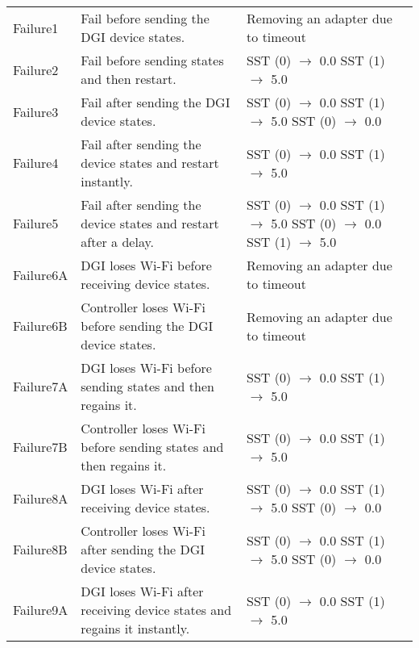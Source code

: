 \documentclass{article}
\begin{document}
\begin{center}
\begin{footnotesize}
\begin{longtable}{|p{3cm}|p{4cm}|p{10cm}|c|}
    Failure1 & Fail before sending the DGI device states. & Removing an adapter due to timeout & \\
    Failure2 & Fail before sending states and then restart. & SST (0) $\rightarrow$ 0.0 \newline SST (1) $\rightarrow$ 5.0 & \\
    Failure3 & Fail after sending the DGI device states. & SST (0) $\rightarrow$ 0.0 \newline SST (1) $\rightarrow$ 5.0 \newline SST (0) $\rightarrow$ 0.0 & \\
    Failure4 & Fail after sending the device states and restart instantly. & SST (0) $\rightarrow$ 0.0 \newline SST (1) $\rightarrow$ 5.0 & \\
    Failure5 & Fail after sending the device states and restart after a delay. & SST (0) $\rightarrow$ 0.0 \newline SST (1) $\rightarrow$ 5.0 \newline SST (0) $\rightarrow$ 0.0 \newline SST (1) $\rightarrow$ 5.0 & \\
    Failure6A & DGI loses Wi-Fi before receiving device states. & Removing an adapter due to timeout & \\
    Failure6B & Controller loses Wi-Fi before sending the DGI device states. & Removing an adapter due to timeout & \\
    Failure7A & DGI loses Wi-Fi before sending states and then regains it. & SST (0) $\rightarrow$ 0.0 \newline SST (1) $\rightarrow$ 5.0 & \\
    Failure7B & Controller loses Wi-Fi before sending states and then regains it. & SST (0) $\rightarrow$ 0.0 \newline SST (1) $\rightarrow$ 5.0 & \\
    Failure8A & DGI loses Wi-Fi after receiving device states. & SST (0) $\rightarrow$ 0.0 \newline SST (1) $\rightarrow$ 5.0 \newline SST (0) $\rightarrow$ 0.0 & \\
    Failure8B & Controller loses Wi-Fi after sending the DGI device states. & SST (0) $\rightarrow$ 0.0 \newline SST (1) $\rightarrow$ 5.0 \newline SST (0) $\rightarrow$ 0.0 & \\
    Failure9A & DGI loses Wi-Fi after receiving device states and regains it instantly. & SST (0) $\rightarrow$ 0.0 \newline SST (1) $\rightarrow$ 5.0 & \\

\end{longtable}
\end{footnotesize}
\end{center}
\end{document}
